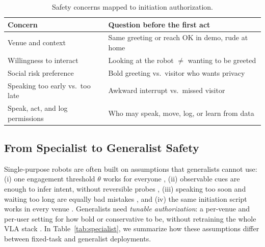 \begin{table}[H]
\small
\centering
\caption{Safety concerns mapped to initiation authorization.}
\label{tab:themes}
\begin{tabular*}{\columnwidth}{@{\extracolsep{\fill}}>{\raggedright\arraybackslash}p{}>{\raggedright\arraybackslash}p{}@{}}
\toprule
\textbf{Concern} & \textbf{Question before the first act} \\
\midrule
Venue and context & Same greeting or reach OK in demo, rude at home \\
\midrule
Willingness to interact & Looking at the robot $\neq$ wanting to be greeted \\
\midrule
Social risk preference & Bold greeting vs.\ visitor who wants privacy \\
\midrule
Speaking too early vs.\ too late & Awkward interrupt vs.\ missed visitor \\
\midrule
Speak, act, and log permissions & Who may speak, move, log, or learn from data \\
\bottomrule
\end{tabular*}
\end{table}

\FloatBarrier

\subsection{From Specialist to Generalist Safety}

Single-purpose robots are often built on assumptions that generalists
cannot use: (i) one engagement threshold $\theta$ works for everyone
\citep{bohus2014,rich2010}, (ii) observable cues are enough to infer
intent, without reversible probes
\citep{skantze2014speech,broek2024proactive}, (iii) speaking too soon
and waiting too long are equally bad mistakes
\citep{shi2011spatial}, and (iv) the same initiation script works in
every venue \citep{edirisinghe2024shopworker,akalin2021}. Generalists
need \emph{tunable authorization}: a per-venue and per-user setting for
how bold or conservative to be, without retraining the whole VLA stack
\citep{harland2024adaptivealignment}. In Table~\ref{tab:specialist}, we
summarize how these assumptions differ between fixed-task and
generalist deployments.


